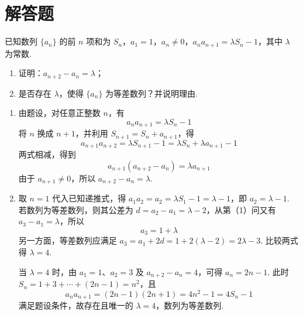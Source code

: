 \section{解答题}

\begin{problem}
已知数列 \(\{a_{n}\}\) 的前 \(n\) 项和为 \(S_{n}\)，\(a_{1} = 1\)，\(a_{n} \neq 0\)，\(a_{n}a_{n+1} = \lambda S_{n} - 1\)，其中 \(\lambda\) 为常数.

\begin{enumerate}
\item 证明：\(a_{n+2}-a_{n}=\lambda\)；
\item 是否存在 \(\lambda\)，使得 \(\{a_{n}\}\) 为等差数列？并说明理由.
\end{enumerate}
\end{problem}

\begin{solution}
\begin{enumerate}
\item 由题设，对任意正整数 \(n\)，有
\[
a_na_{n+1}=\lambda S_n-1
\]
将 \(n\) 换成 \(n+1\)，并利用 \(S_{n+1}=S_n+a_{n+1}\)，得
\[
a_{n+1}a_{n+2}=\lambda S_{n+1}-1
 =\lambda S_n+\lambda a_{n+1}-1
\]
两式相减，得到
\[
a_{n+1}(a_{n+2}-a_n)=\lambda a_{n+1}
\]
由于 \(a_{n+1}\ne0\)，所以
\(a_{n+2}-a_n=\lambda\).

\item 取 \(n=1\) 代入已知递推式，得
\(a_1a_2=a_2=\lambda S_1-1=\lambda-1\)，即 \(a_2=\lambda-1\).
若数列为等差数列，则其公差为
\(d=a_2-a_1=\lambda-2\)，从第（1）问又有
\(a_3-a_1=\lambda\)，所以
\[
a_3=1+\lambda
\]
另一方面，等差数列应满足
\(a_3=a_1+2d=1+2(\lambda-2)=2\lambda-3\). 比较两式得
\(\lambda=4\).

当 \(\lambda=4\) 时，由 \(a_1=1\)、\(a_2=3\) 及
\(a_{n+2}-a_n=4\)，可得 \(a_n=2n-1\). 此时
\(S_n=1+3+\cdots+(2n-1)=n^2\)，且
\[
a_na_{n+1}=(2n-1)(2n+1)=4n^2-1=4S_n-1
\]
满足题设条件，故存在且唯一的 \(\lambda=4\)，数列为等差数列.
\end{enumerate}
\end{solution}

